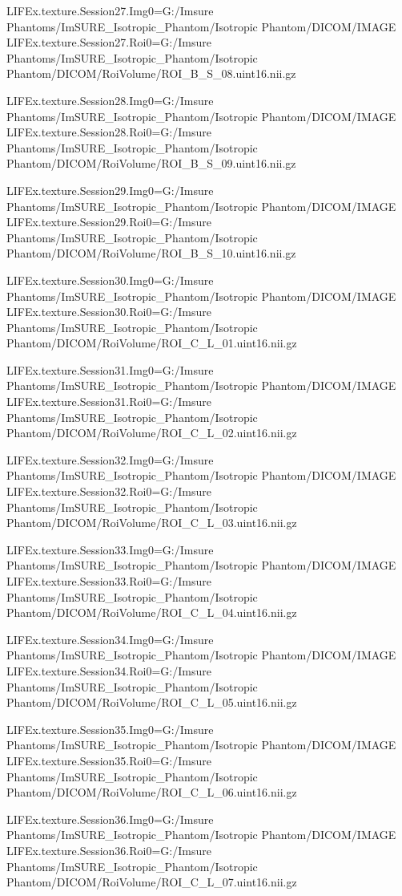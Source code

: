 LIFEx.texture.Session27.Img0=G:/Imsure Phantoms/ImSURE_Isotropic_Phantom/Isotropic Phantom/DICOM/IMAGE
LIFEx.texture.Session27.Roi0=G:/Imsure Phantoms/ImSURE_Isotropic_Phantom/Isotropic Phantom/DICOM/RoiVolume/ROI_B_S_08.uint16.nii.gz

LIFEx.texture.Session28.Img0=G:/Imsure Phantoms/ImSURE_Isotropic_Phantom/Isotropic Phantom/DICOM/IMAGE
LIFEx.texture.Session28.Roi0=G:/Imsure Phantoms/ImSURE_Isotropic_Phantom/Isotropic Phantom/DICOM/RoiVolume/ROI_B_S_09.uint16.nii.gz

LIFEx.texture.Session29.Img0=G:/Imsure Phantoms/ImSURE_Isotropic_Phantom/Isotropic Phantom/DICOM/IMAGE
LIFEx.texture.Session29.Roi0=G:/Imsure Phantoms/ImSURE_Isotropic_Phantom/Isotropic Phantom/DICOM/RoiVolume/ROI_B_S_10.uint16.nii.gz

LIFEx.texture.Session30.Img0=G:/Imsure Phantoms/ImSURE_Isotropic_Phantom/Isotropic Phantom/DICOM/IMAGE
LIFEx.texture.Session30.Roi0=G:/Imsure Phantoms/ImSURE_Isotropic_Phantom/Isotropic Phantom/DICOM/RoiVolume/ROI_C_L_01.uint16.nii.gz

LIFEx.texture.Session31.Img0=G:/Imsure Phantoms/ImSURE_Isotropic_Phantom/Isotropic Phantom/DICOM/IMAGE
LIFEx.texture.Session31.Roi0=G:/Imsure Phantoms/ImSURE_Isotropic_Phantom/Isotropic Phantom/DICOM/RoiVolume/ROI_C_L_02.uint16.nii.gz

LIFEx.texture.Session32.Img0=G:/Imsure Phantoms/ImSURE_Isotropic_Phantom/Isotropic Phantom/DICOM/IMAGE
LIFEx.texture.Session32.Roi0=G:/Imsure Phantoms/ImSURE_Isotropic_Phantom/Isotropic Phantom/DICOM/RoiVolume/ROI_C_L_03.uint16.nii.gz

LIFEx.texture.Session33.Img0=G:/Imsure Phantoms/ImSURE_Isotropic_Phantom/Isotropic Phantom/DICOM/IMAGE
LIFEx.texture.Session33.Roi0=G:/Imsure Phantoms/ImSURE_Isotropic_Phantom/Isotropic Phantom/DICOM/RoiVolume/ROI_C_L_04.uint16.nii.gz

LIFEx.texture.Session34.Img0=G:/Imsure Phantoms/ImSURE_Isotropic_Phantom/Isotropic Phantom/DICOM/IMAGE
LIFEx.texture.Session34.Roi0=G:/Imsure Phantoms/ImSURE_Isotropic_Phantom/Isotropic Phantom/DICOM/RoiVolume/ROI_C_L_05.uint16.nii.gz

LIFEx.texture.Session35.Img0=G:/Imsure Phantoms/ImSURE_Isotropic_Phantom/Isotropic Phantom/DICOM/IMAGE
LIFEx.texture.Session35.Roi0=G:/Imsure Phantoms/ImSURE_Isotropic_Phantom/Isotropic Phantom/DICOM/RoiVolume/ROI_C_L_06.uint16.nii.gz

LIFEx.texture.Session36.Img0=G:/Imsure Phantoms/ImSURE_Isotropic_Phantom/Isotropic Phantom/DICOM/IMAGE
LIFEx.texture.Session36.Roi0=G:/Imsure Phantoms/ImSURE_Isotropic_Phantom/Isotropic Phantom/DICOM/RoiVolume/ROI_C_L_07.uint16.nii.gz

